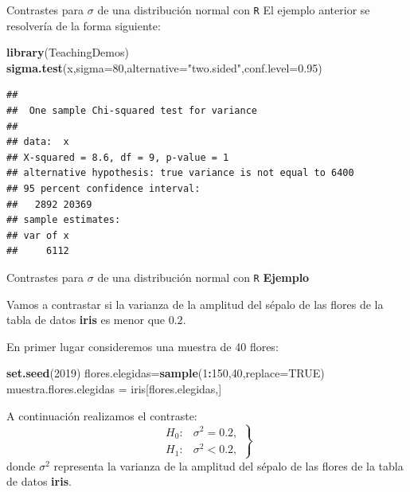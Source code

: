 \documentclass[
  ignorenonframetext,
]{beamer}
\newenvironment{Shaded}{\begin{snugshade}}{\end{snugshade}}
\newcommand{\DataTypeTok}[1]{\textcolor[rgb]{0.13,0.29,0.53}{#1}}
\newcommand{\DecValTok}[1]{\textcolor[rgb]{0.00,0.00,0.81}{#1}}
\newcommand{\FloatTok}[1]{\textcolor[rgb]{0.00,0.00,0.81}{#1}}
\newcommand{\KeywordTok}[1]{\textcolor[rgb]{0.13,0.29,0.53}{\textbf{#1}}}
\newcommand{\NormalTok}[1]{#1}
\newcommand{\OperatorTok}[1]{\textcolor[rgb]{0.81,0.36,0.00}{\textbf{#1}}}
\newcommand{\OtherTok}[1]{\textcolor[rgb]{0.56,0.35,0.01}{#1}}
\newcommand{\StringTok}[1]{\textcolor[rgb]{0.31,0.60,0.02}{#1}}
\begin{document}
\begin{frame}[fragile]{Contrastes para \(\sigma\) de una distribución
normal con \texttt{R}}
\protect\hypertarget{contrastes-para-sigma-de-una-distribuciuxf3n-normal-con-r-1}{}
El ejemplo anterior se resolvería de la forma siguiente:

\begin{Shaded}
\begin{Highlighting}[]
\KeywordTok{library}\NormalTok{(TeachingDemos)}
\KeywordTok{sigma.test}\NormalTok{(x,}\DataTypeTok{sigma=}\DecValTok{80}\NormalTok{,}\DataTypeTok{alternative=}\StringTok{"two.sided"}\NormalTok{,}\DataTypeTok{conf.level=}\FloatTok{0.95}\NormalTok{)}
\end{Highlighting}
\end{Shaded}

\begin{verbatim}
## 
##  One sample Chi-squared test for variance
## 
## data:  x
## X-squared = 8.6, df = 9, p-value = 1
## alternative hypothesis: true variance is not equal to 6400
## 95 percent confidence interval:
##   2892 20369
## sample estimates:
## var of x 
##     6112
\end{verbatim}
\end{frame}

\begin{frame}[fragile]{Contrastes para \(\sigma\) de una distribución
normal con \texttt{R}}
\protect\hypertarget{contrastes-para-sigma-de-una-distribuciuxf3n-normal-con-r-2}{}
\textbf{Ejemplo}

Vamos a contrastar si la varianza de la amplitud del sépalo de las
flores de la tabla de datos \textbf{iris} es menor que \(0.2\).

En primer lugar consideremos una muestra de 40 flores:

\begin{Shaded}
\begin{Highlighting}[]
\KeywordTok{set.seed}\NormalTok{(}\DecValTok{2019}\NormalTok{)}
\NormalTok{flores.elegidas=}\KeywordTok{sample}\NormalTok{(}\DecValTok{1}\OperatorTok{:}\DecValTok{150}\NormalTok{,}\DecValTok{40}\NormalTok{,}\DataTypeTok{replace=}\OtherTok{TRUE}\NormalTok{)}
\NormalTok{muestra.flores.elegidas =}\StringTok{ }\NormalTok{iris[flores.elegidas,]}
\end{Highlighting}
\end{Shaded}

A continuación realizamos el contraste: \[
\left.
\begin{array}{ll}
H_0: & \sigma^2 = 0.2, \\
H_1: & \sigma^2 < 0.2,
\end{array}
\right\}
\] donde \(\sigma^2\) representa la varianza de la amplitud del sépalo
de las flores de la tabla de datos \textbf{iris}.
\end{frame}
\end{document}
